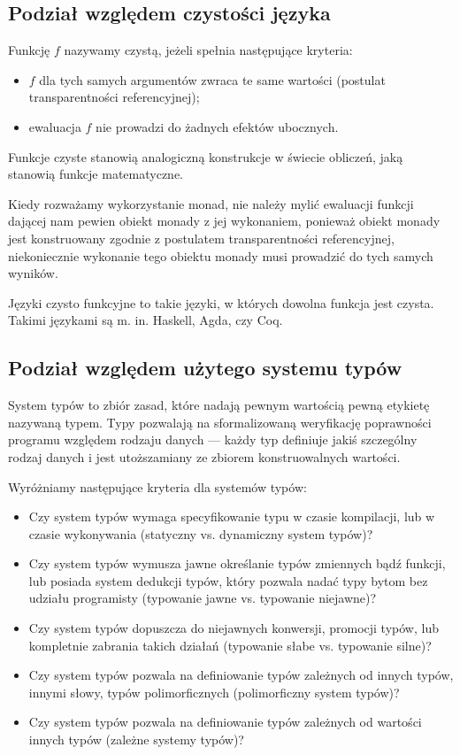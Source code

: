 \documentclass[../praca.tex]{subfiles}
\begin{document}
\subsection{Podział względem czystości języka}

Funkcję \( f \) nazywamy czystą, jeżeli spełnia następujące kryteria:~\cite{Milewski:PF}
\begin{itemize}
  \item \( f \) dla tych samych argumentów zwraca te same wartości
    (postulat transparentności referencyjnej);
  \item ewaluacja \( f \) nie prowadzi do żadnych efektów ubocznych.
\end{itemize}

Funkcje czyste stanowią analogiczną konstrukcje w świecie obliczeń, jaką stanowią
funkcje matematyczne.

\begin{remark}
  Kiedy rozważamy wykorzystanie monad, nie należy mylić ewaluacji funkcji
  dającej nam pewien obiekt monady z jej wykonaniem, ponieważ
  obiekt monady jest konstruowany zgodnie z postulatem transparentności referencyjnej,
  niekoniecznie wykonanie tego obiektu monady musi prowadzić do tych samych wyników.
\end{remark}

Języki czysto funkcyjne to takie języki, w których dowolna funkcja jest czysta. 
Takimi językami są m. in. Haskell, Agda, czy Coq.

\subsection{Podział względem użytego systemu typów}

System typów to zbiór zasad, które nadają pewnym wartością pewną etykietę
nazywaną typem. Typy pozwalają na sformalizowaną weryfikację poprawności
programu względem rodzaju danych --- każdy typ definiuje jakiś szczególny
rodzaj danych i jest utoższamiany ze zbiorem konstruowalnych wartości.~\cite{Pierce:TPL}

Wyróżniamy następujące kryteria dla systemów typów:

\begin{itemize}
  \item Czy system typów wymaga specyfikowanie typu w czasie kompilacji,
    lub w czasie wykonywania (statyczny vs. dynamiczny system typów)?
  \item Czy system typów wymusza jawne określanie typów zmiennych
    bądź funkcji, lub posiada system dedukcji typów, który pozwala
    nadać typy bytom bez udziału programisty (typowanie jawne vs.
    typowanie niejawne)?
  \item Czy system typów dopuszcza do niejawnych konwersji, promocji
    typów, lub kompletnie zabrania takich działań (typowanie słabe
    vs. typowanie silne)?
  \item Czy system typów pozwala na definiowanie typów zależnych
    od innych typów, innymi słowy, typów polimorficznych (polimorficzny
    system typów)?
  \item Czy system typów pozwala na definiowanie typów zależnych
    od wartości innych typów (zależne systemy typów)?
\end{itemize}
\end{document}
